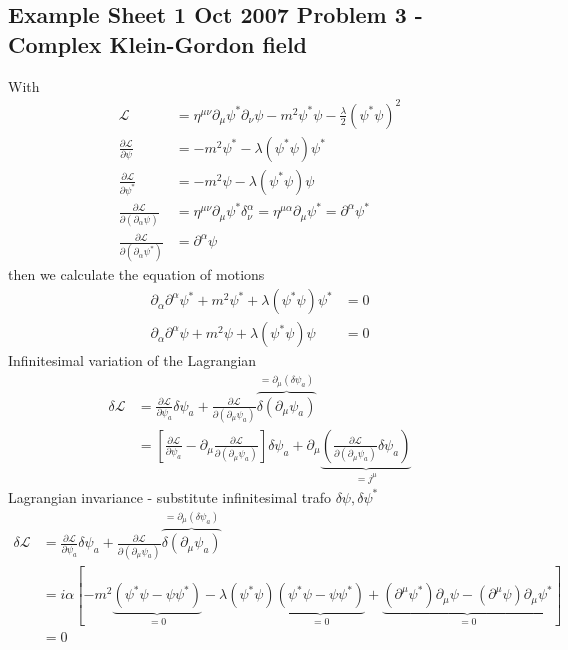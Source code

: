 \documentclass[10pt,a4paper]{book}
\theoremstyle{definition}
\begin{document}
\subsection{Example Sheet 1 Oct 2007 Problem 3 - Complex Klein-Gordon field}
With
\begin{align}
\mathcal{L}
&=\eta^{\mu\nu}\partial_\mu\psi^*\partial_\nu\psi-m^2\psi^*\psi-\frac{\lambda}{2}(\psi^*\psi)^2\\
\frac{\partial \mathcal{L}}{\partial\psi}
&=-m^2\psi^*-\lambda(\psi^*\psi)\psi^*\\
\frac{\partial \mathcal{L}}{\partial\psi^*}
&=-m^2\psi-\lambda(\psi^*\psi)\psi\\
\frac{\partial \mathcal{L}}{\partial(\partial_\alpha\psi)}
&=\eta^{\mu\nu}\partial_\mu\psi^*\delta^\alpha_\nu
=\eta^{\mu\alpha}\partial_\mu\psi^*
=\partial^\alpha\psi^*\\
\frac{\partial \mathcal{L}}{\partial(\partial_\alpha\psi^*)}
&=\partial^\alpha\psi
\end{align}
then we calculate the equation of motions
\begin{align}
\partial_\alpha\partial^\alpha\psi^*+m^2\psi^*+\lambda(\psi^*\psi)\psi^*&=0\\
\partial_\alpha\partial^\alpha\psi+m^2\psi+\lambda(\psi^*\psi)\psi&=0
\end{align}
Infinitesimal variation of the Lagrangian
\begin{align}
\delta\mathcal{L}
&=\frac{\partial\mathcal{L}}{\partial\psi_a}\delta\psi_a+\frac{\partial\mathcal{L}}{\partial(\partial_\mu\psi_a)}\overbrace{\delta(\partial_\mu\psi_a)}^{=\partial_\mu(\delta\psi_a)}\\
&=\left[\frac{\partial\mathcal{L}}{\partial\psi_a}-\partial_\mu\frac{\partial\mathcal{L}}{\partial(\partial_\mu\psi_a)}\right]\delta\psi_a+\partial_\mu\underbrace{\left(\frac{\partial\mathcal{L}}{\partial(\partial_\mu\psi_a)}\delta\psi_a\right)}_{=j^\mu}
\end{align}
Lagrangian invariance - substitute infinitesimal trafo $\delta\psi, \delta\psi^*$
\begin{align}
\delta\mathcal{L}
&=\frac{\partial\mathcal{L}}{\partial\psi_a}\delta\psi_a+\frac{\partial\mathcal{L}}{\partial(\partial_\mu\psi_a)}\overbrace{\delta(\partial_\mu\psi_a)}^{=\partial_\mu(\delta\psi_a)}\\
&=i\alpha\left[-m^2\underbrace{(\psi^*\psi-\psi\psi^*)}_{=0}-\lambda(\psi^*\psi)\underbrace{(\psi^*\psi-\psi\psi^*)}_{=0}+\underbrace{(\partial^\mu\psi^*)\partial_\mu\psi-(\partial^\mu\psi)\partial_\mu\psi^*}_{=0}\right]\\
&=0
\end{align}
\end{document}
